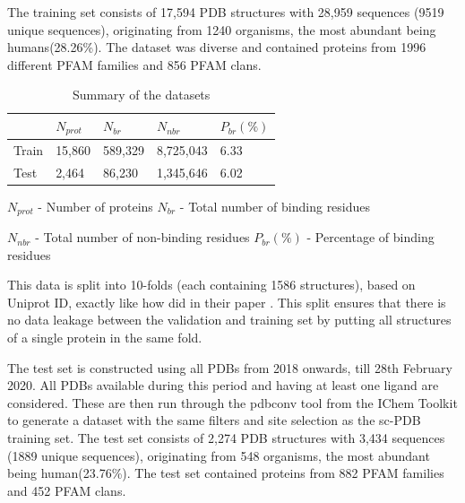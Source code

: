 \documentclass[journal=jacsat,manuscript=article]{achemso}
\begin{document}
The training set consists of 17,594 PDB structures with 28,959 sequences (9519 unique sequences), originating from 1240 organisms, the most abundant being humans(28.26\%). The dataset was diverse and contained proteins from 1996 different PFAM families and 856 PFAM clans.

\begin{table}
    \centering
    \begin{tabular}{| P{2.75cm} | P{2.75cm} | P{2.75cm} | P{2.75cm} | P{2.75cm} |}
        \hline
              & $N_{prot}$ & $N_{br}$ & $N_{nbr}$ & $P_{br}(\%)$ \\
        \hline
        Train & 15,860     & 589,329  & 8,725,043 & 6.33         \\
        Test  & 2,464      & 86,230   & 1,345,646 & 6.02         \\
        \hline
    \end{tabular}
    \caption{\label{tab:dataset_summary} Summary of the datasets}
    \vspace{5 mm}
    \noindent $N_{prot}$ - Number of proteins \hfill $N_{br}$ - Total number of binding residues

    \vspace{3 mm}

    \noindent $N_{nbr}$ - Total number of non-binding residues \hfill $P_{br}(\%)$ - Percentage of binding residues
\end{table}

This data is split into 10-folds (each containing 1586 structures), based on Uniprot ID, exactly like how \citeauthor{stepniewska2020improving} did in their paper \cite{stepniewska2020improving}. This split ensures that there is no data leakage between the validation and training set by putting all structures of a single protein in the same fold.

The test set is constructed using all PDBs from 2018 onwards, till 28th February 2020. All PDBs available during this period and having at least one ligand are considered. These are then run through the pdbconv tool from the IChem Toolkit \cite{da2018ichem} to generate a dataset with the same filters and site selection as the sc-PDB training set. The test set consists of 2,274 PDB structures with 3,434 sequences (1889 unique sequences), originating from 548 organisms, the most abundant being human(23.76\%). The test set contained proteins from 882 PFAM families and 452 PFAM clans.
\end{document}
